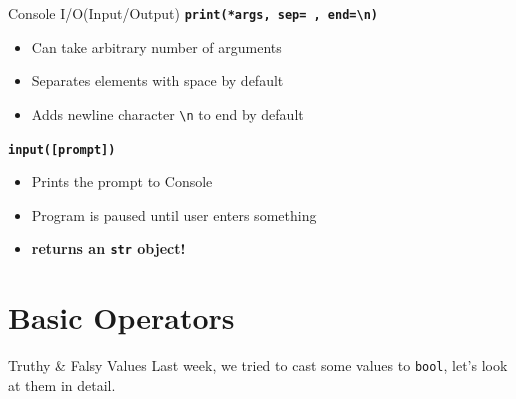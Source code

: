         \begin{frame}{Console I/O(Input/Output)}
            \huge
            \textbf{\texttt{print(*args, sep=\textquotesingle \ \textquotesingle, end=\textquotesingle \textbackslash n\textquotesingle )}}
            \begin{itemize}
                \LARGE
                \item Can take arbitrary number of arguments
                \item Separates elements with space by default
                \item Adds newline character \texttt{\textquotesingle \textbackslash n\textquotesingle} to end by default
            \end{itemize}
            
            \textbf{\texttt{input([prompt])}}
            \begin{itemize}
                \LARGE
                \item Prints the prompt to Console
                \item Program is paused until user enters something
                \item \textbf{returns an \texttt{str} object!} 
            \end{itemize}
        \end{frame}

    \section{Basic Operators}
        \begin{frame}{Truthy \& Falsy Values}
            \LARGE
            Last week, we tried to cast some values to \texttt{bool}, let's look at them in detail.
            
            \begin{columns}
                    \inputminted[firstline=1, lastline=8, frame=single,framesep=2pt]{python3}{code-examples/truthy-falsy.py}
                \pause
                    \inputminted[firstline=9, lastline=16, frame=single,framesep=2pt]{python3}{code-examples/truthy-falsy.py}
            \end{columns}
        \end{frame}

